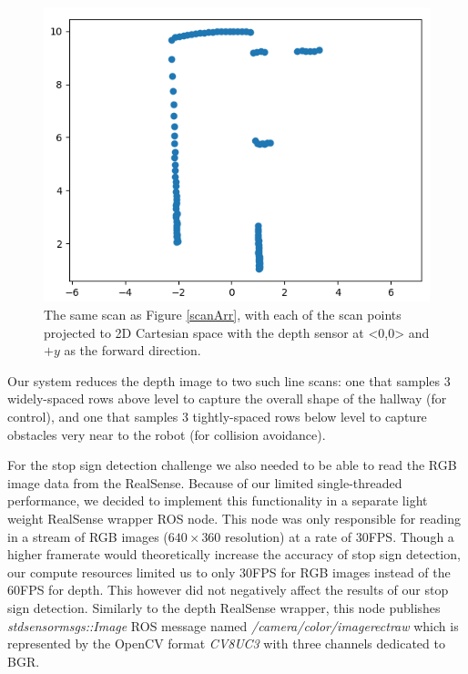 \documentclass[letterpaper, 10 pt, conference]{ieeeconf}  %
\begin{document}
\begin{figure}[b]
    \centering
    \includegraphics[width=\columnwidth]{Figures/scanCart.png}
    \caption{The same scan as Figure \ref{scanArr}, with each of the scan points projected to 2D Cartesian space with the depth sensor at <0,0> and $+y$ as the forward direction.}
    \label{scanCart}
\end{figure}

Our system reduces the depth image to two such line scans: one that samples 3 widely-spaced rows above level to capture the overall shape of the hallway (for control), and one that samples 3 tightly-spaced rows below level to capture obstacles very near to the robot (for collision avoidance).

For the stop sign detection challenge we also needed to be able to read the RGB image data from the RealSense. Because of our limited single-threaded performance, we decided to implement this functionality in a separate light weight RealSense wrapper ROS node. This node was only responsible for reading in a stream of RGB images ($640 \times 360$ resolution) at a rate of 30FPS. Though a higher framerate would theoretically increase the accuracy of stop sign detection, our compute resources limited us to only 30FPS for RGB images instead of the 60FPS for depth. This however did not negatively affect the results of our stop sign detection. Similarly to the depth RealSense wrapper, this node publishes \textit{std\textunderscore{}sensor\textunderscore{}msgs::Image} ROS message named \textit{/camera/color/image\textunderscore{}rect\textunderscore{}raw} which is represented by the OpenCV format \textit{CV\textunderscore{}8UC3} with three channels dedicated to BGR.
\end{document}
